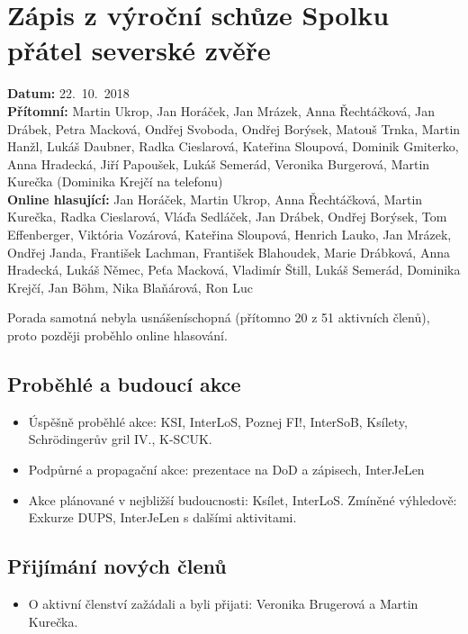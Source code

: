 \documentclass[11pt,a4paper]{article}
\begin{document}
\section*{Zápis z výroční schůze Spolku přátel severské zvěře}
\textbf{Datum:} 22.~10.~2018\\
\textbf{Přítomní:} Martin Ukrop, Jan Horáček, Jan Mrázek, Anna Řechtáčková, Jan Drábek, Petra Macková, Ondřej Svoboda, Ondřej Borýsek, Matouš Trnka, Martin Hanžl, Lukáš Daubner, Radka Cieslarová, Kateřina Sloupová, Dominik Gmiterko, Anna Hradecká, Jiří Papoušek, Lukáš Semerád, Veronika Burgerová, Martin Kurečka (Dominika Krejčí na telefonu)\\
\textbf{Online hlasující:} Jan Horáček, Martin Ukrop, Anna Řechtáčková, Martin Kurečka, Radka Cieslarová, Vláďa Sedláček, Jan Drábek, Ondřej Borýsek, Tom Effenberger, Viktória Vozárová, Kateřina Sloupová, Henrich Lauko, Jan Mrázek, Ondřej Janda, František Lachman, František Blahoudek, Marie Drábková, Anna Hradecká, Lukáš Němec, Peťa Macková, Vladimír Štill, Lukáš Semerád, Dominika Krejčí, Jan Böhm, Nika Blaňárová, Ron Luc

\vspace{1em}

\noindent Porada samotná nebyla usnášeníschopná (přítomno 20 z 51 aktivních členů), proto později proběhlo online hlasování.

\subsection*{Proběhlé a budoucí akce}
\begin{itemize}[itemsep=0pt]
\item Úspěšně proběhlé akce: KSI, InterLoS, Poznej FI!, InterSoB, Ksílety, Schrödingerův gril IV., K-SCUK.
\item Podpůrné a propagační akce: prezentace na DoD a zápisech, InterJeLen
\item Akce plánované v nejbližší budoucnosti: Ksílet, InterLoS. Zmíněné výhledově: Exkurze DUPS, InterJeLen s dalšími aktivitami.
\end{itemize}

\subsection*{Přijímání nových členů}
\begin{itemize}[itemsep=0pt]
\item O aktivní členství zažádali a byli přijati: Veronika Brugerová a Martin Kurečka.
\end{itemize}
\end{document}
